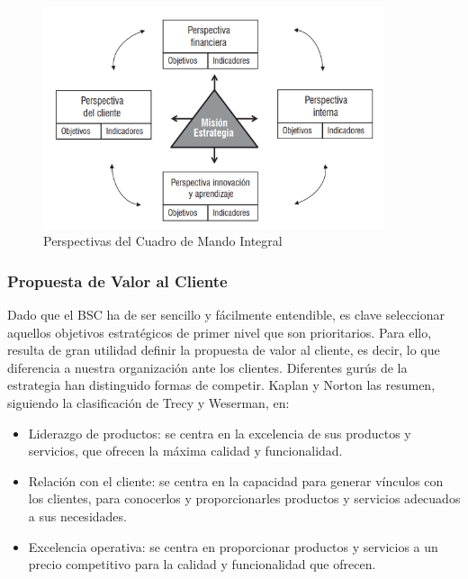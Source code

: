 \documentclass[preprint,12pt]{elsarticle}
\begin{document}
	\begin{figure}[htb]
		\begin{center}
			\includegraphics[height=6.5cm]{./IMAGENES/Perspectivas_BSC} 
			\caption{Perspectivas del Cuadro de Mando Integral} 
		\end{center}
	\end{figure}



\subsubsection{\textbf{Propuesta de Valor al Cliente}}


Dado que el BSC ha de ser sencillo y fácilmente entendible, es clave seleccionar aquellos objetivos estratégicos de primer nivel que son prioritarios. Para ello, resulta de gran utilidad definir la propuesta de valor al cliente, es decir, lo que diferencia a nuestra organización ante los clientes. Diferentes gurús de la estrategia han distinguido formas de competir. Kaplan y Norton las resumen, siguiendo la clasificación de Trecy y Weserman, en:

	\begin{itemize}
	\item Liderazgo de productos: se centra en la excelencia de sus productos y servicios, que ofrecen la máxima calidad y funcionalidad.
	\item Relación con el cliente: se centra en la capacidad para generar vínculos con los clientes, para conocerlos y proporcionarles productos y servicios adecuados a sus necesidades.
	\item Excelencia operativa: se centra en proporcionar productos y servicios a un precio competitivo para la calidad y funcionalidad que ofrecen.
	\end{itemize}
\end{document}
